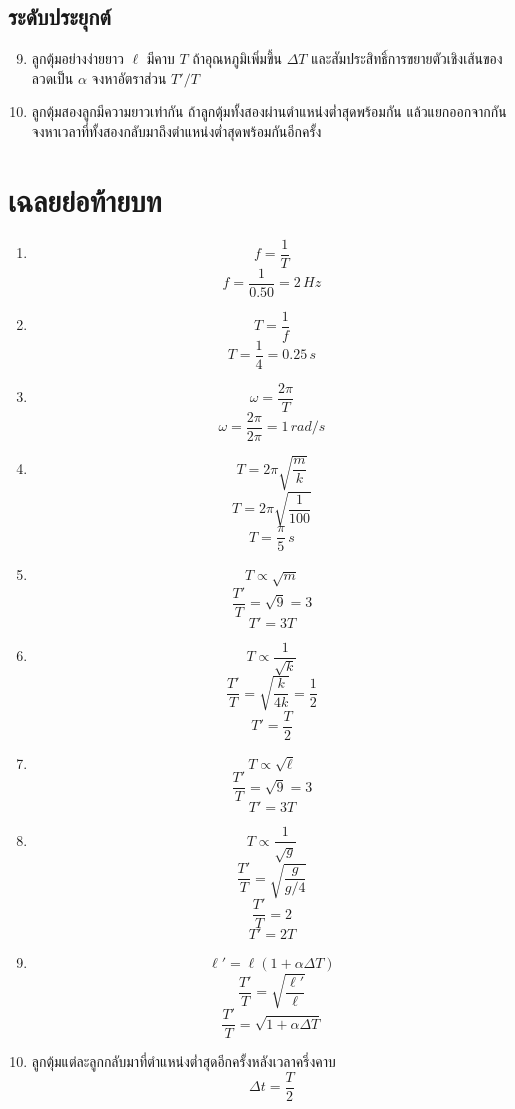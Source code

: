 \subsection*{ระดับประยุกต์}

\begin{enumerate}
    \setcounter{enumi}{8}
    \item ลูกตุ้มอย่างง่ายยาว $\ell$ มีคาบ $T$ ถ้าอุณหภูมิเพิ่มขึ้น $\Delta T$ และสัมประสิทธิ์การขยายตัวเชิงเส้นของลวดเป็น $\alpha$ จงหาอัตราส่วน $T'/T$
    \item ลูกตุ้มสองลูกมีความยาวเท่ากัน ถ้าลูกตุ้มทั้งสองผ่านตำแหน่งต่ำสุดพร้อมกัน แล้วแยกออกจากกัน จงหาเวลาที่ทั้งสองกลับมาถึงตำแหน่งต่ำสุดพร้อมกันอีกครั้ง
\end{enumerate}

\section{เฉลยย่อท้ายบท}

\begin{enumerate}
    \item
    \[
    f=\frac{1}{T}
    \]
    \[
    f=\frac{1}{0.50}=2\,\si{Hz}
    \]

    \item
    \[
    T=\frac{1}{f}
    \]
    \[
    T=\frac{1}{4}=0.25\,\si{s}
    \]

    \item
    \[
    \omega=\frac{2\pi}{T}
    \]
    \[
    \omega=\frac{2\pi}{2\pi}=1\,\si{rad/s}
    \]

    \item
    \[
    T=2\pi\sqrt{\frac{m}{k}}
    \]
    \[
    T=2\pi\sqrt{\frac{1}{100}}
    \]
    \[
    T=\frac{\pi}{5}\,\si{s}
    \]

    \item
    \[
    T\propto\sqrt{m}
    \]
    \[
    \frac{T'}{T}=\sqrt{9}=3
    \]
    \[
    \boxed{T'=3T}
    \]

    \item
    \[
    T\propto\frac{1}{\sqrt{k}}
    \]
    \[
    \frac{T'}{T}=\sqrt{\frac{k}{4k}}=\frac{1}{2}
    \]
    \[
    \boxed{T'=\frac{T}{2}}
    \]

    \item
    \[
    T\propto\sqrt{\ell}
    \]
    \[
    \frac{T'}{T}=\sqrt{9}=3
    \]
    \[
    \boxed{T'=3T}
    \]

    \item
    \[
    T\propto\frac{1}{\sqrt{g}}
    \]
    \[
    \frac{T'}{T}
    =
    \sqrt{\frac{g}{g/4}}
    \]
    \[
    \frac{T'}{T}=2
    \]
    \[
    \boxed{T'=2T}
    \]

    \item
    \[
    \ell'=\ell(1+\alpha\Delta T)
    \]
    \[
    \frac{T'}{T}
    =
    \sqrt{\frac{\ell'}{\ell}}
    \]
    \[
    \boxed{
    \frac{T'}{T}
    =
    \sqrt{1+\alpha\Delta T}
    }
    \]

    \item
    ลูกตุ้มแต่ละลูกกลับมาที่ตำแหน่งต่ำสุดอีกครั้งหลังเวลาครึ่งคาบ
    \[
    \boxed{\Delta t=\frac{T}{2}}
    \]
\end{enumerate}

